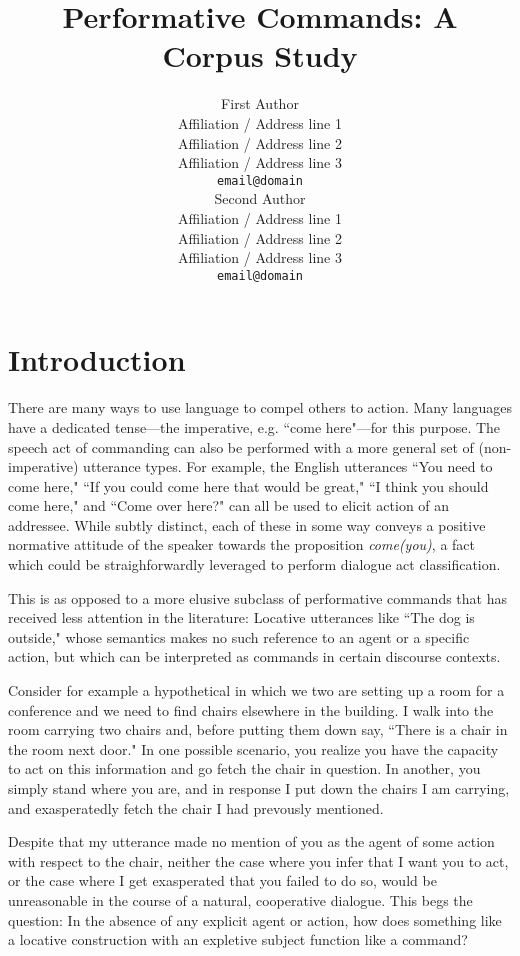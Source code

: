 \documentclass[11pt,a4paper]{article}
\title{Performative Commands: A Corpus Study}
\author{First Author \\
  Affiliation / Address line 1 \\
  Affiliation / Address line 2 \\
  Affiliation / Address line 3 \\
  {\tt email@domain} \\\And
  Second Author \\
  Affiliation / Address line 1 \\
  Affiliation / Address line 2 \\
  Affiliation / Address line 3 \\
  {\tt email@domain} \\}
\date{}
\begin{document}
\maketitle

\section{Introduction}

There are many ways to use language to compel others to action. Many languages have a dedicated tense---the imperative, e.g. ``come here"---for this purpose. The speech act of commanding can also be performed with a more general set of (non-imperative) utterance types. For example, the English utterances 
``You need to come here," ``If you could come here that would be great," ``I think you should come here," and ``Come over here?" can all be used to elicit action of an addressee. While subtly distinct, each of these in some way conveys a positive normative attitude of the speaker towards the proposition \textit{come(you)}, a fact which could be straighforwardly leveraged to perform dialogue act classification.

This is as opposed to a more elusive subclass of performative commands that has received less attention in the literature: Locative utterances like ``The dog is outside," whose semantics makes no such reference to an agent or a specific action, but which can be interpreted as commands in certain discourse contexts. 

Consider for example a hypothetical in which we two are setting up a room for a conference and we need to find chairs elsewhere in the building. I walk into the room carrying two chairs and, before putting them down say, ``There is a chair in the room next door." In one possible scenario, you realize you have the capacity to act on this information and go fetch the chair in question. In another, you simply stand where you are, and in response I put down the chairs I am carrying, and exasperatedly fetch the chair I had prevously mentioned.

Despite that my utterance made no mention of you as the agent of some action with respect to the chair, neither the case where you infer that I want you to act, or the case where I get exasperated that you failed to do so, would be unreasonable in the course of a natural, cooperative dialogue. This begs the question: In the absence of any explicit agent or action, how does something like a locative construction with an expletive subject function like a command? 
\end{document}
